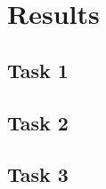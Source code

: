 \section{Results} \label{sec:results}

\subsection{Task 1}

\subsection{Task 2}

\subsection{Task 3}


